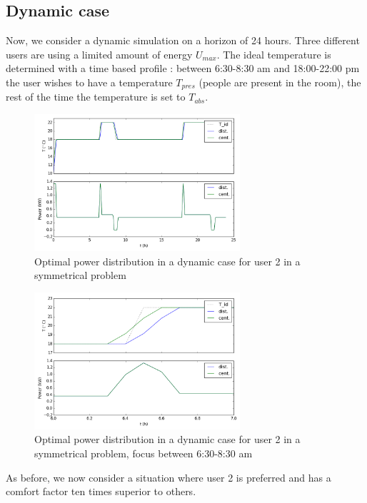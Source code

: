 \documentclass[conference]{IEEEtran}
\edef\hc{\string:}
\begin{document}
 \subsection{Dynamic case}
 Now, we consider a dynamic simulation on a horizon of 24 hours. Three different users are using a limited amount of energy $U_{max}$. The ideal temperature is determined with a time based profile : between 6\hc 30-8\hc 30 am and 18\hc 00-22\hc 00 pm the user wishes to have a temperature $T_{pres}$ (people are present in the room), the rest of the time the temperature is set to $T_{abs}$. 
 
\begin{figure}[H]
\centering
\includegraphics[width=3in]{dynDMPC_init.png}
\caption{Optimal power distribution in a dynamic case for user 2 in a symmetrical problem}
\label{dynDPBinit}
\end{figure}
\begin{figure}[H]
\centering
\includegraphics[width=3in]{dynDMPC_initZOOM.png}
\caption{Optimal power distribution in a dynamic case for user 2 in a symmetrical problem, focus between 6\hc 30-8\hc 30 am}
\label{dynDPBinit}
\end{figure}

As before, we now consider a situation where user 2 is preferred and has a comfort factor ten times superior to others. 
 
\end{document}
